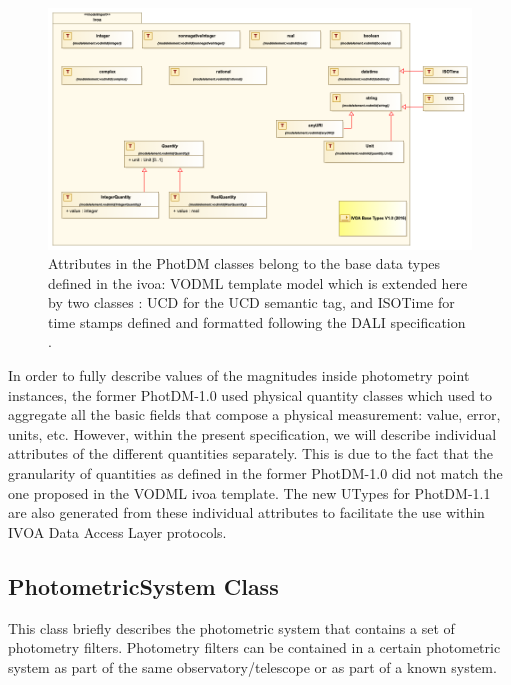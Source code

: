 \documentclass[11pt,a4paper]{ivoa}
\begin{document}
\begin{figure}[H]
\includegraphics[angle=0,width=5.98in ]{./schema/BaseDataTypesdiagram.png}
\caption{Attributes in the PhotDM classes belong to the base data types defined in the ivoa: VODML template model which is extended here by two classes : UCD for the UCD semantic tag, and ISOTime for time stamps defined and formatted following the DALI specification \citep{2017ivoa.spec.0517D} .}
\end{figure}





\newpage


\newpage
In order to fully describe values of the magnitudes inside photometry point
instances, the former PhotDM-1.0 used  physical quantity classes which used to
aggregate all the basic fields that compose a physical measurement: value,
error, units, etc. However, within the present specification, we will describe
individual attributes of the different quantities separately.
This is due to the fact that the granularity of quantities as defined in the former PhotDM-1.0
did not match the one proposed in the VODML ivoa template. The new UTypes for PhotDM-1.1 are also
generated from these individual attributes to facilitate the use within IVOA Data Access Layer protocols.

\par

\subsection{PhotometricSystem Class}
This class briefly describes the photometric system that contains a set of
photometry filters. Photometry filters can be contained in a certain
photometric system as part of the same observatory/telescope or as part
of a known system.
\par
\end{document}
